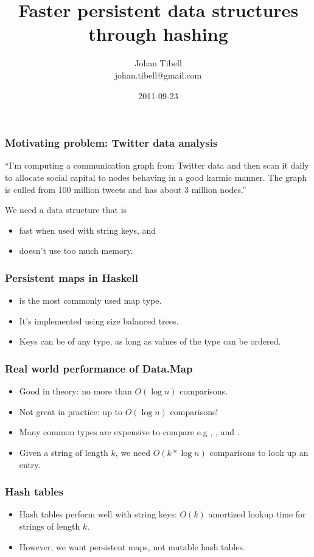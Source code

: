 \documentclass[xetex,mathserif,serif]{beamer}
\title{Faster persistent data structures through hashing}
\author{Johan Tibell\\johan.tibell@gmail.com}
\date{2011-09-23}
\newcommand{\code}[1]{\mbox{\texttt{\small{\color{CodeColor}{#1}}}}}
\begin{document}

\frame{\titlepage}

\begin{frame}
  \frametitle{Motivating problem: Twitter data analysis}

  ``I'm computing a communication graph from Twitter data and then
  scan it daily to allocate social capital to nodes behaving in a good
  karmic manner.  The graph is culled from 100 million tweets and has
  about 3 million nodes.''

  \bigskip
  We need a data structure that is
  \begin{itemize}
  \item fast when used with string keys, and
  \item doesn't use too much memory.
  \end{itemize}
\end{frame}

\begin{frame}
  \frametitle{Persistent maps in Haskell}

  \begin{itemize}
  \item \code{Data.Map} is the most commonly used map type.
  \item It's implemented using size balanced trees.
  \item Keys can be of any type, as long as values of the type can be
    ordered.
  \end{itemize}
\end{frame}

\begin{frame}
  \frametitle{Real world performance of Data.Map}

  \begin{itemize}
  \item Good in theory: no more than $O(\log n)$ comparisons.
  \item Not great in practice: up to $O(\log n)$ comparisons!
  \item Many common types are expensive to compare e.g
    \code{String}, \code{ByteString}, and \code{Text}.
  \item Given a string of length $k$, we need $O(k*\log n)$
    comparisons to look up an entry.
  \end{itemize}
\end{frame}

\begin{frame}
  \frametitle{Hash tables}
  \begin{itemize}
  \item Hash tables perform well with string keys: $O(k)$ amortized
    lookup time for strings of length $k$.
  \item However, we want persistent maps, not mutable hash tables.
  \end{itemize}
\end{frame}
\end{document}
